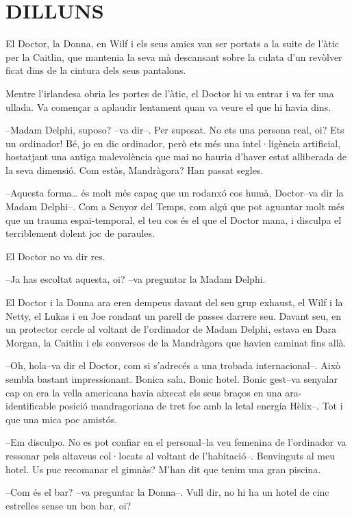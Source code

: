 \chapter*{DILLUNS}

El Doctor, la Donna, en Wilf i els seus amics van ser portats a la suite
de l'àtic per la Caitlin, que mantenia la seva mà descansant sobre la
culata d'un revòlver ficat dins de la cintura dels seus pantalons.

Mentre l'irlandesa obria les portes de l'àtic, el Doctor hi va entrar i
va fer una ullada. Va començar a aplaudir lentament quan va veure el que
hi havia dins.

--Madam Delphi, suposo? --va dir--. Per suposat. No ets una persona
real, oi? Ets un ordinador! Bé, jo en dic ordinador, però ets més una
intel·ligència artificial, hostatjant una antiga malevolència que mai no
hauria d'haver estat alliberada de la seva dimensió. Com estàs,
Mandràgora? Han passat segles.

--Aquesta forma\ldots{} és molt més capaç que un rodanxó cos humà,
Doctor--va dir la Madam Delphi--. Com a Senyor del Temps, com algú que
pot aguantar molt més que un trauma espai-temporal, el teu cos és el que
el Doctor mana, i disculpa el terriblement dolent joc de paraules.

El Doctor no va dir res.

--Ja has escoltat aquesta, oi? --va preguntar la Madam Delphi.

El Doctor i la Donna ara eren dempeus davant del seu grup exhaust, el
Wilf i la Netty, el Lukas i en Joe rondant un parell de passes darrere
seu. Davant seu, en un protector cercle al voltant de l'ordinador de
Madam Delphi, estava en Dara Morgan, la Caitlin i els conversos de la
Mandràgora que havien caminat fins allà.

--Oh, hola--va dir el Doctor, com si s'adrecés a una trobada
internacional--. Això sembla bastant impressionant. Bonica sala. Bonic
hotel. Bonic gest--va senyalar cap on era la vella americana havia
aixecat els seus braços en una ara-identificable posició mandragoriana
de tret foc amb la letal energia Hèlix--. Tot i que una mica poc
amistós.

--Em disculpo. No es pot confiar en el personal--la veu femenina de
l'ordinador va ressonar pels altaveus col·locats al voltant de
l'habitació--. Benvinguts al meu hotel. Us puc recomanar el gimnàs?
M'han dit que tenim una gran piscina.

--Com és el bar? --va preguntar la Donna--. Vull dir, no hi ha un hotel
de cinc estrelles sense un bon bar, oi?

